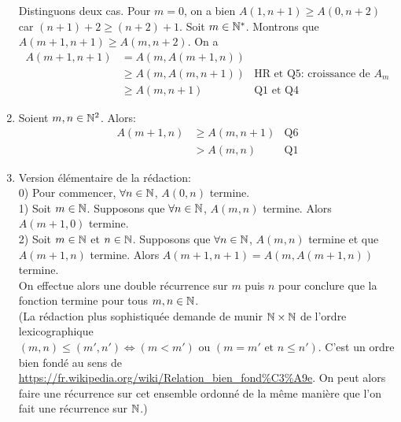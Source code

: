 \documentclass[11pt,a4paper]{article}
\begin{document}
\begin{enumerate}
Distinguons deux cas.
Pour $m=0$, on a bien $A(1,n+1) \geq A(0,n+2)$ car $(n+1)+2 \geq (n+2)+1$. 
Soit $m\in \mathbb{N}^*$. Montrons que $A(m+1,n+1) \geq A(m,n+2)$. On a 
\begin{align*}
A(m+1,n+1) &= A(m,A(m+1,n))  \\
 &\geq  A(m,A(m,n+1)) & \text{HR et Q5: croissance de }A_m\\
 &\geq  A(m,n+1) & \text{Q1 et Q4}
\end{align*}
\item Soient $m, n \in \mathbb{N}^2$. Alors:
\begin{align*}
A(m+1,n) 
&\geq A(m,n+1) & \text{Q6}\\
&>A(m,n) & \text{Q1}
\end{align*}
\item Version élémentaire de la rédaction: \\
0) Pour commencer, $\forall n\in \mathbb{N}$, $A(0,n)$ termine.\\
1) Soit $m\in\mathbb{N}$. Supposons que $\forall n\in \mathbb{N}$, $A(m,n)$ termine. Alors $A(m+1,0)$ termine.\\
2) Soit $m\in\mathbb{N}$ et $n\in \mathbb{N}$. Supposons que $\forall n\in \mathbb{N}$, $A(m,n)$ termine et que $A(m+1,n)$ termine. Alors $A(m+1,n+1) = A(m,A(m+1,n))$ termine.\\
On effectue alors une double récurrence sur $m$ puis $n$ pour conclure que la fonction termine pour tous $m, n \in \mathbb{N}$.\\
(La rédaction plus sophistiquée demande de munir
$\mathbb{N}\times \mathbb{N}$ de l'ordre lexicographique $(m,n) \leqslant (m',n') \iff (m<m') \text{ ou } (m=m' \text{ et }n\leq n')$. C'est un ordre \og bien fondé\fg{} au sens de \url{https://fr.wikipedia.org/wiki/Relation_bien_fond%C3%A9e}.
On peut alors faire une récurrence sur cet ensemble ordonné de la même manière que l'on fait une récurrence sur $\mathbb{N}$.)


\end{enumerate}
\end{document}
